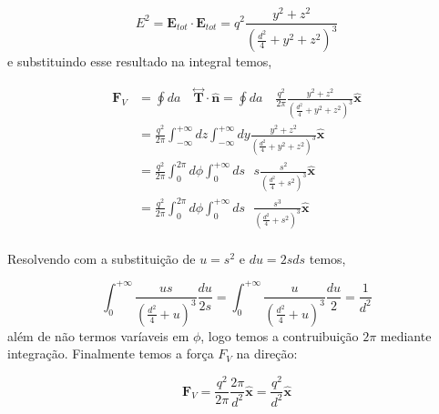 \begin{equation}
	E^2 = \textbf{E}_{tot}\cdot \textbf{E}_{tot} = q^2\frac{y^2+z^2}{\left(\frac{d^2}{4} + y^2 + z^2 \right)^{3}}
\end{equation}
e substituindo esse resultado na integral temos,

\begin{equation}
	\begin{split}
	\textbf{F}_V & = \oint da \quad \overset{\leftrightarrow}{\textbf{T}} \cdot \hat{\textbf{n}} = \oint da \quad \frac{q^2}{2\pi} \frac{y^2 + z^2}{\left(\frac{d^2}{4} + y^2 + z^2 \right)^{3} }\hat{\textbf{x}}\\
	& = \frac{q^2}{2\pi} \int_{-\infty}^{+\infty} dz \int_{-\infty}^{+\infty} dy \frac{y^2 + z^2}{\left(\frac{d^2}{4} + y^2 + z^2 \right)^{3}}\hat{\textbf{x}}\\
	& = \frac{q^2}{2\pi} \int_{0}^{2\pi} d\phi \int_{0}^{+\infty} ds \text{ }s \frac{s^2}{\left(\frac{d^2}{4} + s^2\right)^{3}}\hat{\textbf{x}}\\
	& = \frac{q^2}{2\pi} \int_{0}^{2\pi} d\phi \int_{0}^{+\infty} ds \text{ } \frac{s^3}{\left(\frac{d^2}{4} + s^2\right)^{3}}\hat{\textbf{x}}\\
	\end{split}
\end{equation}

Resolvendo com a substituição de $u = s^2$ e $du = 2sds$ temos,

\begin{equation}
	\int_0^{+\infty}\frac{us}{\left(\frac{d^2}{4} + u\right)^{3}}\frac{du}{2s} = \int_0^{+\infty}\frac{u}{\left(\frac{d^2}{4} + u\right)^{3}}\frac{du}{2} = \frac{1}{d^2}
\end{equation}
além de não termos varíaveis em $\phi$, logo temos a contruibuição $2\pi$ mediante integração. Finalmente temos a força $F_V$ na direção:

\begin{equation}
	\textbf{F}_V = \frac{q^2}{2\pi} \frac{2\pi}{d^2} \hat{\textbf{x}}= \frac{q^2}{d^2}\hat{\textbf{x}}
\end{equation}


